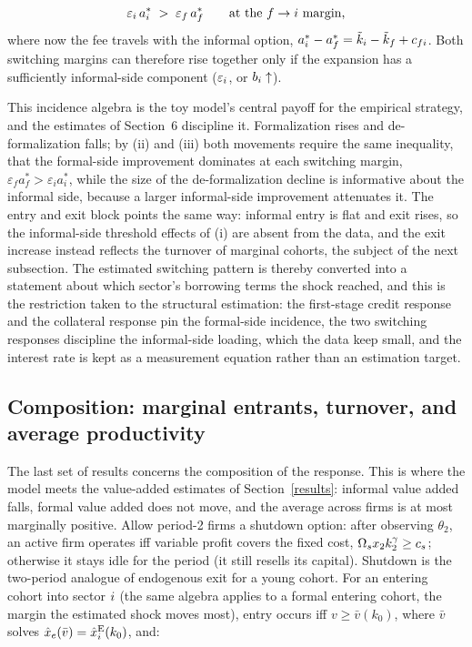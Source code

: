 \documentclass[12pt]{article}
\begin{document}
\begin{corollary}
\begin{enumerate}
    \begin{equation}
        \varepsilon_{i}\,a^{*}_{i}
        \;>\;
        \varepsilon_{f}\,a^{*}_{f}
        \qquad\text{at the } f\to i \text{ margin,}
        \label{eq:toy-ficond}
    \end{equation}
    where now the fee travels with the informal option,
    $a^{*}_{i}-a^{*}_{f}
    =\tilde{k}_{i}-\tilde{k}_{f}+c_{fi}$. Both switching margins can therefore rise together only if the expansion has a sufficiently informal-side component
    ($\varepsilon_{i}$, or $b_{i}\uparrow$).
\end{enumerate}

\end{corollary}

This incidence algebra is the toy model's central payoff for the empirical strategy, and the estimates of Section~6 discipline it. Formalization rises and de-formalization falls; by (ii) and (iii) both movements require the same inequality, that the formal-side improvement dominates at each switching margin, $\varepsilon_f a_f^* > \varepsilon_i a_i^*$, while the size of the de-formalization decline is informative about the informal side, because a larger informal-side improvement attenuates it. The entry and exit block points the same way: informal entry is flat and exit rises, so the informal-side threshold effects of (i) are absent from the data, and the exit increase instead reflects the turnover of marginal cohorts, the subject of the next subsection. The estimated switching pattern is thereby converted into a statement about which sector's borrowing terms the shock reached, and this is the restriction taken to the structural estimation: the first-stage credit response and the collateral response pin the formal-side incidence, the two switching responses discipline the informal-side loading, which the data keep small, and the interest rate is kept as a measurement equation rather than an estimation target.
 
\subsection{Composition: marginal entrants, turnover, and average productivity}
\label{sec:toy-composition}

The last set of results concerns the composition of the response. This is where the model meets the value-added estimates of Section~\ref{results}: informal value added falls, formal value added does not move, and the average across firms is at most marginally positive. Allow period-2 firms a shutdown option: after observing $\theta_{2}$, an active firm operates iff variable profit covers the fixed cost, $\Omega_{s}x_{2}k_{2}^{\gamma}\geq c_{s}$; otherwise it stays idle for the period (it still resells its capital). Shutdown is the two-period analogue of endogenous exit for a young cohort. For an entering cohort into sector $i$ (the same algebra applies to a formal entering cohort, the margin the estimated shock moves most), entry occurs iff $v\geq \bar{v}(k_{0})$, where $\bar v$ solves $\hat{x}_{e}(\bar v)=\hat{x}^{\mathrm{E}}_{i}(k_{0})$, and:
\end{document}

